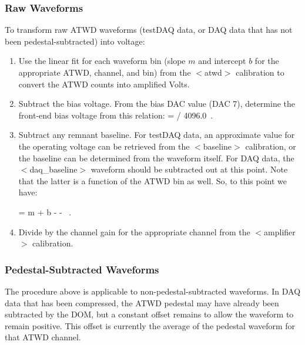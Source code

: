 \documentclass[10pt]{article}
\begin{document}
\subsubsection{Raw Waveforms}

To transform raw ATWD waveforms (testDAQ data, or DAQ data that has not
been pedestal-subtracted) into voltage: 

\begin{enumerate}

\item{Use the linear fit for each waveform bin (slope $m$ and intercept $b$
  for the appropriate ATWD, channel, and bin) from the $<$atwd$>$
  calibration to convert the ATWD counts into amplified Volts.}

\item{Subtract the bias voltage.  From the bias DAC value (DAC 7),
  determine the front-end bias voltage from this relation:}
\be
{} =   / 4096.0\ .
\ee

\item{Subtract any remnant baseline.  For testDAQ data, an approximate
  value for the operating voltage can be retrieved from the $<$baseline$>$
  calibration, or the baseline can be determined from the waveform itself.
  For DAQ data, the $<$daq\_baseline$>$ waveform should be subtracted out
  at this point.  Note that the latter is a function of the ATWD bin as well.  
  So, to this point we have:}

\be
{} = m \cdot {} + b -  - \ .
\ee

\item{Divide by the channel gain for the appropriate channel from the
  $<$amplifier$>$ calibration.} 

\end{enumerate}

\subsubsection{Pedestal-Subtracted Waveforms}

The procedure above is applicable to non-pedestal-subtracted
waveforms.  In DAQ data that has been compressed, the ATWD pedestal may have
already been subtracted by the DOM, but a constant offset remains to allow
the waveform to remain positive.  This offset is currently the average of
the pedestal waveform for that ATWD channel.  
\end{document}
